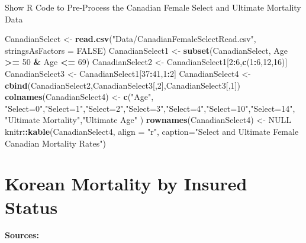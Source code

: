 \documentclass[
]{book}
\newenvironment{Shaded}{\begin{snugshade}}{\end{snugshade}}
\newcommand{\DataTypeTok}[1]{\textcolor[rgb]{0.13,0.29,0.53}{#1}}
\newcommand{\DecValTok}[1]{\textcolor[rgb]{0.00,0.00,0.81}{#1}}
\newcommand{\KeywordTok}[1]{\textcolor[rgb]{0.13,0.29,0.53}{\textbf{#1}}}
\newcommand{\NormalTok}[1]{#1}
\newcommand{\OperatorTok}[1]{\textcolor[rgb]{0.81,0.36,0.00}{\textbf{#1}}}
\newcommand{\OtherTok}[1]{\textcolor[rgb]{0.56,0.35,0.01}{#1}}
\newcommand{\StringTok}[1]{\textcolor[rgb]{0.31,0.60,0.02}{#1}}
\begin{document}
Show R Code to Pre-Process the Canadian Female Select and Ultimate Mortality Data

\hypertarget{toggleCode.DataDict.2}{}
\begin{Shaded}
\begin{Highlighting}[]
\NormalTok{CanadianSelect <-}\StringTok{ }\KeywordTok{read.csv}\NormalTok{(}\StringTok{"Data/CanadianFemaleSelectRead.csv"}\NormalTok{, }\DataTypeTok{stringsAsFactors =} \OtherTok{FALSE}\NormalTok{)}
\NormalTok{CanadianSelect1 <-}\StringTok{ }\KeywordTok{subset}\NormalTok{(CanadianSelect, Age }\OperatorTok{>=}\StringTok{ }\DecValTok{50} \OperatorTok{&}\StringTok{ }\NormalTok{Age }\OperatorTok{<=}\StringTok{ }\DecValTok{69}\NormalTok{)}
\NormalTok{CanadianSelect2 <-}\StringTok{ }\NormalTok{CanadianSelect1[}\DecValTok{2}\OperatorTok{:}\DecValTok{6}\NormalTok{,}\KeywordTok{c}\NormalTok{(}\DecValTok{1}\OperatorTok{:}\DecValTok{6}\NormalTok{,}\DecValTok{12}\NormalTok{,}\DecValTok{16}\NormalTok{)]}
\NormalTok{CanadianSelect3 <-}\StringTok{ }\NormalTok{CanadianSelect1[}\DecValTok{37}\OperatorTok{:}\DecValTok{41}\NormalTok{,}\DecValTok{1}\OperatorTok{:}\DecValTok{2}\NormalTok{]}
\NormalTok{CanadianSelect4 <-}\StringTok{ }\KeywordTok{cbind}\NormalTok{(CanadianSelect2,CanadianSelect3[,}\DecValTok{2}\NormalTok{],CanadianSelect3[,}\DecValTok{1}\NormalTok{])}
\KeywordTok{colnames}\NormalTok{(CanadianSelect4) <-}\StringTok{ }\KeywordTok{c}\NormalTok{(}\StringTok{"Age"}\NormalTok{, }\StringTok{"Select=0"}\NormalTok{,}\StringTok{"Select=1"}\NormalTok{,}\StringTok{"Select=2"}\NormalTok{,}\StringTok{"Select=3"}\NormalTok{,}\StringTok{"Select=4"}\NormalTok{,}\StringTok{"Select=10"}\NormalTok{,}\StringTok{"Select=14"}\NormalTok{, }\StringTok{"Ultimate Mortality"}\NormalTok{,}\StringTok{"Ultimate Age"}\NormalTok{ )}
\KeywordTok{rownames}\NormalTok{(CanadianSelect4) <-}\StringTok{ }\OtherTok{NULL}
\NormalTok{knitr}\OperatorTok{::}\KeywordTok{kable}\NormalTok{(CanadianSelect4, }\DataTypeTok{align =} \StringTok{"r"}\NormalTok{, }\DataTypeTok{caption=}\StringTok{"Select and Ultimate Female Canadian Mortality Rates"}\NormalTok{)}
\end{Highlighting}
\end{Shaded}

\hypertarget{Sec:KoreanMortality}{%
\section{Korean Mortality by Insured Status}\label{Sec:KoreanMortality}}

\textbf{Sources:}
\end{document}
